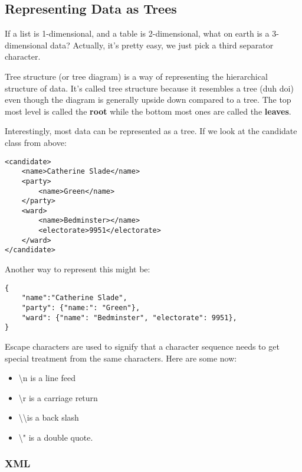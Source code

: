 \documentclass[11pt,a4paper,titlepage,dvipsnames,cmyk]{scrartcl}
\begin{document}
\subsection{Representing Data as Trees}%
\label{sub:tree-data}
If a list is 1-dimensional, and a table is 2-dimensional, what on earth is
a 3-dimensional data? Actually, it's pretty easy, we just pick a third
separator character.

Tree structure (or tree diagram) is a way of representing the hierarchical
structure of data. It's called tree structure because it resembles a tree
(duh doi) even though the diagram is generally upside down compared to a
tree. The top most level is called the \textbf{root} while the bottom most
ones are called the \textbf{leaves}.

Interestingly, most data can be represented as a tree. If we look at the
candidate class from above:

\begin{lstlisting}[]
<candidate>
    <name>Catherine Slade</name>
    <party>
        <name>Green</name>
    </party>
    <ward>
        <name>Bedminster></name>
        <electorate>9951</electorate>
    </ward>
</candidate>
\end{lstlisting}

Another way to represent this might be:

\begin{lstlisting}[]
{
    "name":"Catherine Slade",
    "party": {"name:": "Green"},
    "ward": {"name": "Bedminster", "electorate": 9951},
}
\end{lstlisting}

Escape characters are used to signify that a character sequence needs to
get special treatment from the same characters. Here are some now:

\begin{itemize}
    \item \textbackslash n is a line feed
    \item \textbackslash r is a carriage return
    \item \textbackslash \textbackslash \text{ }is a back slash
    \item \textbackslash " is a double quote.
\end{itemize}

\subsubsection{XML}%
\label{ssub:XML}
\end{document}

